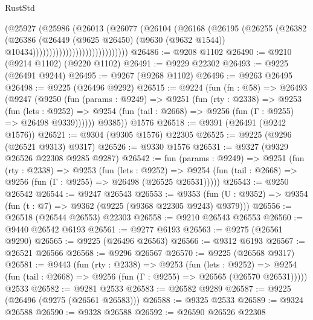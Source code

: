 \begin{lexlean}{RustStd}
\begin{coremodule}
                                        (@25927
                                          (@25986
                                            (@26013
                                              (@26077
                                                (@26104
                                                  (@26168
                                                    (@26195
                                                      (@26255
                                                        (@26382
                                                          (@26386
                                                            (@26449
                                                              (@9625 @26450)
                                                              (@9630 (@9632 @1544))
                                                              @10434)))))))))))))))))))))))))))))
@26486 := @9208 @1102
@26490 := @9210 (@9214 @1102) (@9220 @1102)
@26491 := @9229 @22302
@26493 := @9225 (@26491 @9244)
@26495 := @9267 (@9268 @1102)
@26496 := @9263 @26495
@26498 := @9225 (@26496 @9292)
@26515 := @9224
    (fun (fn : @58) =>
    @26493
      (@9247
        (@9250
          (fun (params : @9249) =>
          @9251
            (fun (rty : @2338) =>
            @9253
              (fun (lets : @9252) =>
              @9254 (fun (tail : @2668) => @9256 (fun (Γ : @9255) => @26498 @9339))))))
        @9385))
    @1576
@26518 := @9391 (@26491 (@9242 @1576))
@26521 := @9304 (@9305 @1576) @22305
@26525 := @9225 (@9296 (@26521 @9313) @9317)
@26526 := @9330 @1576
@26531 := @9327 (@9329 @26526 @22308 @9285 @9287)
@26542 := fun (params : @9249) =>
  @9251
    (fun (rty : @2338) =>
    @9253
      (fun (lets : @9252) =>
      @9254 (fun (tail : @2668) => @9256 (fun (Γ : @9255) => @26498 (@26525 @26531)))))
@26543 := @9250 @26542
@26544 := @9247 @26543
@26553 := @9353
    (fun (U : @9352) => @9354 (fun (t : @7) => @9362 (@9225 (@9368 @22305 @9243) @9379)))
@26556 := @26518 (@26544 @26553) @22303
@26558 := @9210 @26543 @26553
@26560 := @9440 @26542 @6193
@26561 := @9277 @6193
@26563 := @9275 (@26561 @9290)
@26565 := @9225 (@26496 @26563)
@26566 := @9312 @6193
@26567 := @26521 @26566
@26568 := @9296 @26567
@26570 := @9225 (@26568 @9317)
@26581 := @9443
    (fun (rty : @2338) =>
    @9253
      (fun (lets : @9252) =>
      @9254 (fun (tail : @2668) => @9256 (fun (Γ : @9255) => @26565 (@26570 @26531)))))
    @2533
@26582 := @9281 @2533
@26583 := @26582 @9289
@26587 := @9225 (@26496 (@9275 (@26561 @26583)))
@26588 := @9325 @2533
@26589 := @9324 @26588
@26590 := @9328 @26588
@26592 := @26590 @26526 @22308

\end{coremodule}
\end{lexlean}
